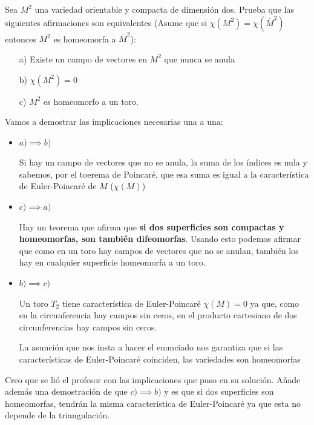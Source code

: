 \begin{problem}[3]
Sea $M^2$ una variedad orientable y compacta de dimensión dos. Prueba que las siguientes afirmaciones son equivalentes (Asume que si $\chi(M^2)=\chi(\overline{M}^2)$ entonces $M^2$ es homeomorfa a $\overline{M}^2$):
\begin{enumerate}
\item[a)] Existe un campo de vectores en $M^2$ que nunca se anula

\item[b)] $\chi(M^2)=0$

\item[c)] $M^2$ es homeomorfo a un toro.
\end{enumerate}
\solution


Vamos a demostrar las implicaciones necesarias una a una:
\begin{itemize}
\item $a) \implies b)$

Si hay un campo de vectores que no se anula, la suma de los índices es nula y sabemos, por el toerema de Poincaré, que esa suma es igual a la característica de Euler-Poincaré de $M$ ($\chi (M)$)

\item $c) \implies a)$

Hay un teorema que afirma que \textbf{si dos superficies son compactas y homeomorfas, son también difeomorfas}. Usando esto podemos afirmar que como en un toro hay campos de vectores que no se anulan, también los hay en cualquier superficie homeomorfa a un toro.

\item $b) \implies c)$

Un toro $T_2$ tiene característica de Euler-Poincaré $\chi (M)=0$ ya que, como en la circunferencia hay campos sin ceros, en el producto cartesiano de dos circunferencias hay campos sin ceros.

La asunción que nos insta a hacer el enunciado nos garantiza que si las características de Euler-Poincaré coinciden, las variedades son homeomorfas

\end{itemize}

Creo que se lió el profesor con las implicaciones que puso en su solución. Añade además una demostración de que $c) \implies b)$ y es que si dos superficies son homeomorfas, tendrán la misma característica de Euler-Poincaré ya que esta no depende de la triangulación.



\end{problem}

